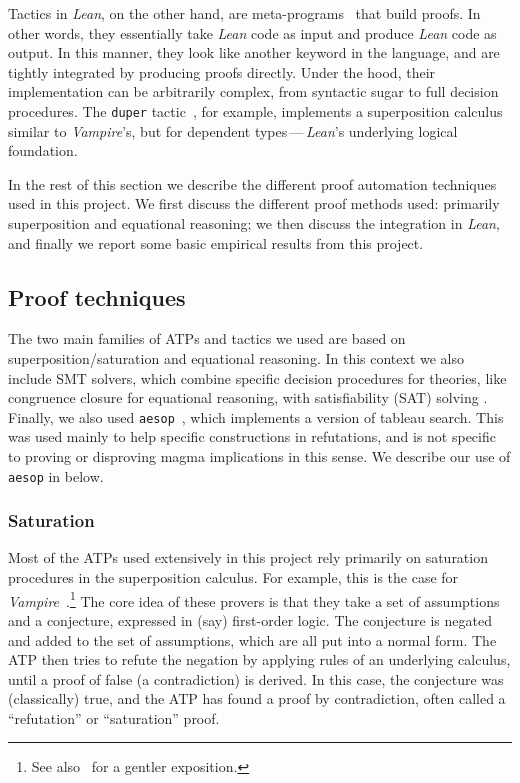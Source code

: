 \documentclass[12pt]{amsart}
\theoremstyle{definition}
\begin{document}
Tactics in \emph{Lean}, on the other hand, are meta-programs~\cite{DBLP:journals/pacmpl/EbnerURAM17} that build proofs.
In other words, they essentially take \emph{Lean} code as input and produce \emph{Lean} code as output.
In this manner, they look like another keyword in the language, and are tightly integrated by producing proofs directly.
Under the hood, their implementation can be arbitrarily complex, from syntactic sugar to full decision procedures.
The \texttt{duper} tactic~\cite{DBLP:conf/itp/CluneQBA24}, for example, implements a superposition calculus similar to \emph{Vampire}'s, but for dependent types\,---\,\emph{Lean}'s underlying logical foundation.

In the rest of this section we describe the different proof automation techniques used in this project.
We first discuss the different proof methods used: primarily superposition and equational reasoning; we then discuss the integration in \emph{Lean}, and finally we report some basic empirical results from this project.

\subsection{Proof techniques}

The two main families of ATPs and tactics we used are based on superposition/saturation and equational reasoning.
In this context we also include SMT solvers, which combine specific decision procedures for theories, like congruence closure for equational reasoning, with satisfiability (SAT) solving \cite{deMoura-Bjorner-2009}.
Finally, we also used \texttt{aesop}~\cite{DBLP:conf/cpp/LimpergF23}, which implements a version of tableau search.
This was used mainly to help specific constructions in refutations, and is not specific to proving or disproving magma implications in this sense.
We describe our use of \texttt{aesop} in  below.

\subsubsection{Saturation}
Most of the ATPs used extensively in this project rely primarily on saturation procedures in the superposition calculus.
For example, this is the case for \emph{Vampire}~\cite{DBLP:conf/cav/KovacsV13}.\footnote{See also~\cite{DBLP:journals/cacm/BentkampBNTVW23} for a gentler exposition.}
The core idea of these provers is that they take a set of assumptions and a conjecture, expressed in (say) first-order logic.
The conjecture is negated and added to the set of assumptions, which are all put into a normal form.
The ATP then tries to refute the negation by applying rules of an underlying calculus, until a proof of false (a contradiction) is derived.
In this case, the conjecture was (classically) true, and the ATP has found a proof by contradiction, often called a ``refutation'' or ``saturation'' proof.
\end{document}
